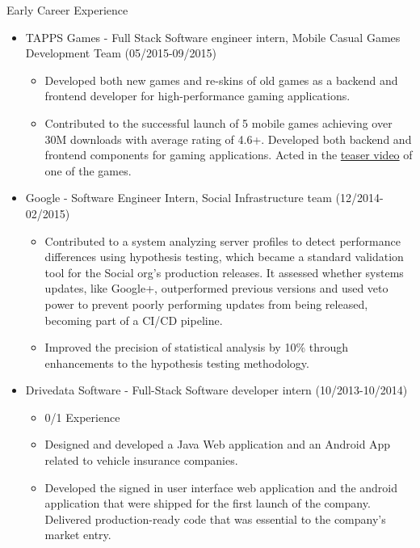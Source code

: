
\normalsize{Early Career Experience}
\begin{itemize}
    \item \footnotesize{TAPPS Games - Full Stack Software engineer intern, Mobile Casual Games 
        Development Team (05/2015-09/2015)}
    \begin{itemize}
        \item \scriptsize{Developed both new games and re-skins of old games as a backend and frontend
        developer for high-performance gaming applications.}
        \item \scriptsize{Contributed to the successful launch of 5 mobile games achieving over 30M
        downloads with average rating of 4.6+. Developed both backend and frontend components for
        gaming applications. Acted in the
        \href{https://www.youtube.com/watch?v=ttjWkk9w-8Q}{teaser video} of one of the games.}
    \end{itemize}
    
    \item \footnotesize{Google - Software Engineer Intern, Social Infrastructure team (12/2014-02/2015)}
    \begin{itemize}
        \item \scriptsize{Contributed to a system analyzing server profiles to detect performance 
            differences using hypothesis testing, which became a standard validation tool for the Social 
            org's production releases. It assessed whether systems updates, like Google+, outperformed
            previous versions and used veto power to prevent poorly performing updates from being 
            released, becoming part of a CI/CD pipeline.}
        \item \scriptsize{Improved the precision of statistical analysis by 10\% through enhancements to 
            the hypothesis testing methodology.}
    \end{itemize}

    \item \footnotesize{Drivedata Software - Full-Stack Software developer intern (10/2013-10/2014)}
    \begin{itemize}
        \item \scriptsize{0/1 Experience}
        \item \scriptsize{Designed and developed a Java Web application and an Android App related to vehicle insurance companies.}
        \item \scriptsize{Developed the signed in user interface web application and the android application that were shipped for the first launch of the company. Delivered production-ready code that was essential to the company's market entry.}
    \end{itemize}


\end{itemize}
